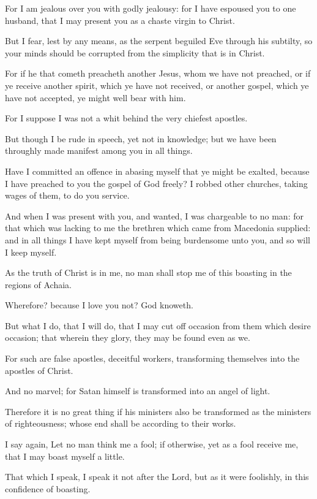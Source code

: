 \Verse For I am jealous over you with godly jealousy: for I have espoused you to one husband, that I may present you as a chaste virgin to Christ.

\Verse But I fear, lest by any means, as the serpent beguiled Eve through his subtilty, so your minds should be corrupted from the simplicity that is in Christ.

\Verse For if he that cometh preacheth another Jesus, whom we have not preached, or if ye receive another spirit, which ye have not received, or another gospel, which ye have not accepted, ye might well bear with him.

\Verse For I suppose I was not a whit behind the very chiefest apostles.

\Verse But though I be rude in speech, yet not in knowledge; but we have been throughly made manifest among you in all things.

\Verse Have I committed an offence in abasing myself that ye might be exalted, because I have preached to you the gospel of God freely?  \Verse I robbed other churches, taking wages of them, to do you service.

\Verse And when I was present with you, and wanted, I was chargeable to no man: for that which was lacking to me the brethren which came from Macedonia supplied: and in all things I have kept myself from being burdensome unto you, and so will I keep myself.

\Verse As the truth of Christ is in me, no man shall stop me of this boasting in the regions of Achaia.

\Verse Wherefore? because I love you not? God knoweth.

\Verse But what I do, that I will do, that I may cut off occasion from them which desire occasion; that wherein they glory, they may be found even as we.

\Verse For such are false apostles, deceitful workers, transforming themselves into the apostles of Christ.

\Verse And no marvel; for Satan himself is transformed into an angel of light.

\Verse Therefore it is no great thing if his ministers also be transformed as the ministers of righteousness; whose end shall be according to their works.

\Verse I say again, Let no man think me a fool; if otherwise, yet as a fool receive me, that I may boast myself a little.

\Verse That which I speak, I speak it not after the Lord, but as it were foolishly, in this confidence of boasting.

